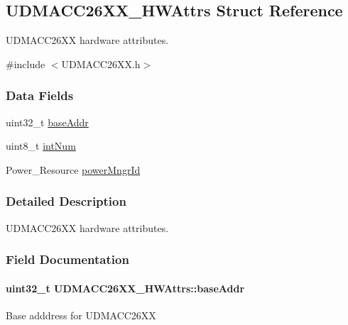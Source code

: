 \subsection{U\+D\+M\+A\+C\+C26\+X\+X\+\_\+\+H\+W\+Attrs Struct Reference}
\label{struct_u_d_m_a_c_c26_x_x___h_w_attrs}


U\+D\+M\+A\+C\+C26\+X\+X hardware attributes.  




{\ttfamily \#include $<$U\+D\+M\+A\+C\+C26\+X\+X.\+h$>$}

\subsubsection*{Data Fields}
\begin{DoxyCompactItemize}
\item 
uint32\+\_\+t \hyperlink{struct_u_d_m_a_c_c26_x_x___h_w_attrs_a62ff254a8b85ecced4f749c35065515d}{base\+Addr}
\item 
uint8\+\_\+t \hyperlink{struct_u_d_m_a_c_c26_x_x___h_w_attrs_a842b5f7c2c0a2563eaf6f037cff07785}{int\+Num}
\item 
Power\+\_\+\+Resource \hyperlink{struct_u_d_m_a_c_c26_x_x___h_w_attrs_a3dd30c452d16f3ffa55696fc15852c0b}{power\+Mngr\+Id}
\end{DoxyCompactItemize}


\subsubsection{Detailed Description}
U\+D\+M\+A\+C\+C26\+X\+X hardware attributes. 

\subsubsection{Field Documentation}
\paragraph[{base\+Addr}]{\setlength{\rightskip}{0pt plus 5cm}uint32\+\_\+t U\+D\+M\+A\+C\+C26\+X\+X\+\_\+\+H\+W\+Attrs\+::base\+Addr}\label{struct_u_d_m_a_c_c26_x_x___h_w_attrs_a62ff254a8b85ecced4f749c35065515d}
Base adddress for U\+D\+M\+A\+C\+C26\+X\+X 

